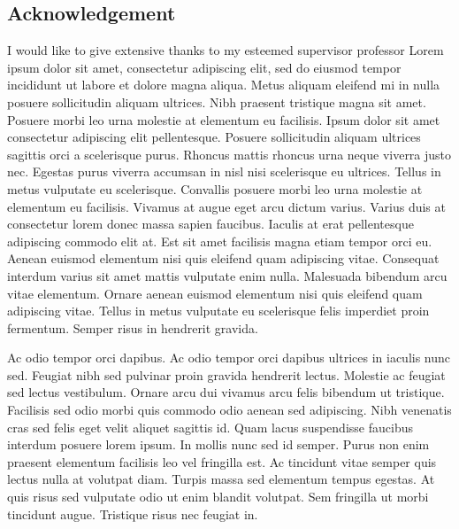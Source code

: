 \newpage
\clearpage
\ifpdf
{}
\fi
\pagestyle{empty}
\begin{center}
	\subsection*{Acknowledgement}
\end{center}


I would like to give extensive thanks to my esteemed supervisor professor Lorem ipsum dolor sit amet, consectetur adipiscing elit, sed do eiusmod tempor incididunt ut labore et dolore magna aliqua. Metus aliquam eleifend mi in nulla posuere sollicitudin aliquam ultrices. Nibh praesent tristique magna sit amet. Posuere morbi leo urna molestie at elementum eu facilisis. Ipsum dolor sit amet consectetur adipiscing elit pellentesque. Posuere sollicitudin aliquam ultrices sagittis orci a scelerisque purus. Rhoncus mattis rhoncus urna neque viverra justo nec. Egestas purus viverra accumsan in nisl nisi scelerisque eu ultrices. Tellus in metus vulputate eu scelerisque. Convallis posuere morbi leo urna molestie at elementum eu facilisis. Vivamus at augue eget arcu dictum varius. Varius duis at consectetur lorem donec massa sapien faucibus. Iaculis at erat pellentesque adipiscing commodo elit at. Est sit amet facilisis magna etiam tempor orci eu. Aenean euismod elementum nisi quis eleifend quam adipiscing vitae. Consequat interdum varius sit amet mattis vulputate enim nulla. Malesuada bibendum arcu vitae elementum. Ornare aenean euismod elementum nisi quis eleifend quam adipiscing vitae. Tellus in metus vulputate eu scelerisque felis imperdiet proin fermentum. Semper risus in hendrerit gravida.

Ac odio tempor orci dapibus. Ac odio tempor orci dapibus ultrices in iaculis nunc sed. Feugiat nibh sed pulvinar proin gravida hendrerit lectus. Molestie ac feugiat sed lectus vestibulum. Ornare arcu dui vivamus arcu felis bibendum ut tristique. Facilisis sed odio morbi quis commodo odio aenean sed adipiscing. Nibh venenatis cras sed felis eget velit aliquet sagittis id. Quam lacus suspendisse faucibus interdum posuere lorem ipsum. In mollis nunc sed id semper. Purus non enim praesent elementum facilisis leo vel fringilla est. Ac tincidunt vitae semper quis lectus nulla at volutpat diam. Turpis massa sed elementum tempus egestas. At quis risus sed vulputate odio ut enim blandit volutpat. Sem fringilla ut morbi tincidunt augue. Tristique risus nec feugiat in.